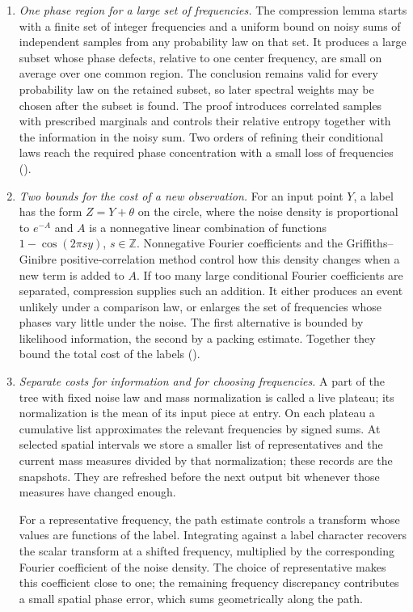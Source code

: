 \begin{enumerate}[leftmargin=*,itemsep=4pt]
\item \emph{One phase region for a large set of frequencies.}
The compression lemma starts with a finite set of integer frequencies
and a uniform bound on noisy sums of independent samples from any
probability law on that set. It produces a large subset whose phase
defects, relative to one center frequency, are small on average over
one common region.
The conclusion remains valid for every probability law on the retained
subset, so later spectral weights may be chosen after the subset is
found. The proof introduces correlated samples with prescribed marginals
and controls their relative entropy together with the information in
the noisy sum. Two orders of refining their conditional laws reach the
required phase concentration with a small loss of frequencies
().

\item \emph{Two bounds for the cost of a new observation.}
For an input point $Y$, a label has the form $Z=Y+\theta$ on the circle,
where the noise density
is proportional to $e^{-A}$ and $A$ is a nonnegative linear combination
of functions $1-\cos(2\pi sy)$, $s\in\mathbb Z$. Nonnegative Fourier
coefficients and the Griffiths--Ginibre positive-correlation method
\cite{Ginibre1970} control how this density changes when a new term
is added to $A$. If too many large conditional Fourier coefficients are
separated, compression supplies such an addition. It either produces
an event unlikely under a comparison law, or enlarges the set of
frequencies whose phases vary little under the noise. The first
alternative is bounded by likelihood information, the second by a
packing estimate. Together they bound the total cost of the labels
().

\item \emph{Separate costs for information and for choosing frequencies.}
A part of the tree with fixed noise law and mass normalization is
called a live plateau; its normalization is the mean of its input piece
at entry. On each plateau a cumulative list approximates the relevant
frequencies by signed sums. At selected spatial intervals we store a
smaller list of representatives and the current mass measures divided
by that normalization; these records are the snapshots.
They are refreshed before the next output bit whenever those measures
have changed enough.

For a representative frequency, the path estimate controls a transform
whose values are functions of the label. Integrating against a label
character recovers the scalar transform at a shifted frequency, multiplied
by the corresponding Fourier coefficient of the noise density. The choice
of representative makes this coefficient close to one;
the remaining frequency discrepancy contributes a small spatial phase
error, which sums geometrically along the path.


\end{enumerate}
